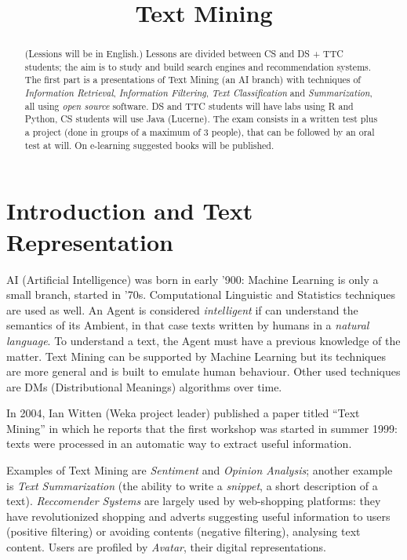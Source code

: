 \documentclass[11pt, a4page]{article}
\title{\textbf{Text Mining}}
\author{}
\date{}
\begin{document}
\maketitle
\begin{abstract}
  (Lessions will be in English.)
  Lessons are divided between CS and DS + TTC students; the aim is to study and build search engines and recommendation systems.
  The first part is a presentations of Text Mining (an AI branch) with techniques of \textit{Information Retrieval}, \textit{Information Filtering}, \textit{Text Classification} and \textit{Summarization}, all using \textit{open source} software.
  DS and TTC students will have labs using R and Python, CS students will use Java (Lucerne).
  The exam consists in a written test plus a project (done in groups of a maximum of 3 people), that can be followed by an oral test at will.
  On e-learning suggested books will be published.
\end{abstract}
\tableofcontents
\newpage

\part{Introduction and Text Representation}
AI (Artificial Intelligence) was born in early '900: Machine Learning is only a small branch, started in '70s.
Computational Linguistic and Statistics techniques are used as well.
An Agent is considered \textit{intelligent} if can understand the semantics of its Ambient, in that case texts written by humans in a \textit{natural language}.
To understand a text, the Agent must have a previous knowledge of the matter.
Text Mining can be supported by Machine Learning but its techniques are more general and is built to emulate human behaviour.
Other used techniques are DMs (Distributional Meanings) algorithms over time.

In 2004, Ian Witten (Weka project leader) published a paper titled ``Text Mining'' in which he reports that the first workshop was started in summer 1999: texts were processed in an automatic way to extract useful information.

Examples of Text Mining are \textit{Sentiment} and \textit{Opinion Analysis}; another example is \textit{Text Summarization} (the ability to write a \textit{snippet}, a short description of a text).
\textit{Reccomender Systems} are largely used by web-shopping platforms: they have revolutionized shopping and adverts suggesting useful information to users (positive filtering) or avoiding contents (negative filtering), analysing text content.
Users are profiled by \textit{Avatar}, their digital representations.
\end{document}
